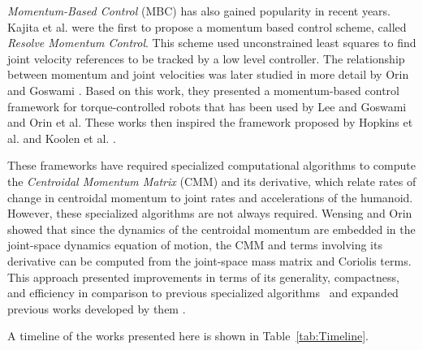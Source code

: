	\emph{Momentum-Based Control} (MBC) has also gained popularity in recent years.
	Kajita et al. \cite{Kajita_IROS2003} were the first to propose a momentum based control scheme,
	called \emph{Resolve Momentum Control}.
	This scheme used unconstrained least squares to find joint velocity references to be tracked by
	a low level controller.
	The relationship between momentum and joint velocities was later studied in more detail by
	Orin and Goswami \cite{Orin_IROS2008}.
	Based on this work, they presented a momentum-based control framework for torque-controlled robots
	that has been used by Lee and Goswami	\cite{LeeS_IROS2010} \cite{LeeS_AutoRobots2012} and
	Orin et al. \cite{Orin_AutoRobots2013}
	These works then inspired the framework proposed by Hopkins et al. \cite{Hopkins_IJHR2016} and
	Koolen et al. \cite{Koolen_IJHR2016}.
	
	These frameworks have required specialized computational algorithms to compute the
	\emph{Centroidal Momentum Matrix} (CMM) and its derivative, which relate rates of change in
	centroidal momentum to joint rates and accelerations of the humanoid.
	However, these specialized algorithms are not always required.
	Wensing and Orin \cite{Wensing_IJHR2016} showed that since the dynamics of the centroidal momentum
	are embedded in the joint-space dynamics equation of motion, the CMM and terms involving its
	derivative can be computed from the joint-space mass matrix and Coriolis terms.
	This approach presented improvements in terms of its generality, compactness, and efficiency in
	comparison to previous specialized algorithms~\cite{Wensing_IJHR2016} and expanded previous
	works developed by them \cite{Wensing_ICRA2013} \cite{Wensing_IJHR2013}.
	
	A timeline of the works presented here is shown in Table~\ref{tab:Timeline}.
	
	
